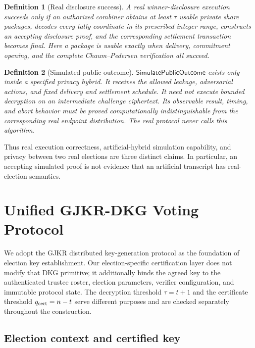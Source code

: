 \documentclass[pdflatex,sn-mathphys-num]{sn-jnl}%
\theoremstyle{thmstyleone}%
\theoremstyle{thmstyletwo}%
\theoremstyle{thmstylethree}%
\newtheorem{definition}{Definition}%
\begin{document}
\begin{definition}[Real disclosure success]
\label{def:th-real-success}
A real winner-disclosure execution succeeds only if an authorized combiner
obtains at least $\tau$ usable private share packages, decodes every tally
coordinate in its prescribed integer range, constructs an accepting disclosure
proof, and the corresponding settlement transaction becomes final.  Here a
package is usable exactly when delivery, commitment opening, and the complete
Chaum--Pedersen verification all succeed.
\end{definition}

\begin{definition}[Simulated public outcome]
\label{def:th-simulated-outcome}
$\mathsf{SimulatePublicOutcome}$ exists only inside a specified privacy hybrid.
It receives the allowed leakage, adversarial actions, and fixed delivery and
settlement schedule.  It need not execute bounded decryption on an intermediate
challenge ciphertext.  Its observable result, timing, and abort behavior must
be proved computationally indistinguishable from the corresponding real
endpoint distribution.  The real protocol never calls this algorithm.
\end{definition}

Thus real execution correctness, artificial-hybrid simulation capability, and
privacy between two real elections are three distinct claims.  In particular,
an accepting simulated proof is not evidence that an artificial transcript has
real-election semantics.

\section{Unified GJKR-DKG Voting Protocol}\label{sec3}

We adopt the GJKR distributed key-generation protocol as the foundation of
election key establishment.  Our election-specific certification layer does
not modify that DKG primitive; it additionally binds the agreed key to the
authenticated trustee roster, election parameters, verifier configuration,
and immutable protocol state.  The decryption threshold $\tau=t+1$ and the
certificate threshold $q_{\rm cert}=n-t$ serve different purposes and are
checked separately throughout the construction.

\subsection{Election context and certified key}\label{subsec:threat-upgrade}
\label{subsec:key-registration}
\end{document}
